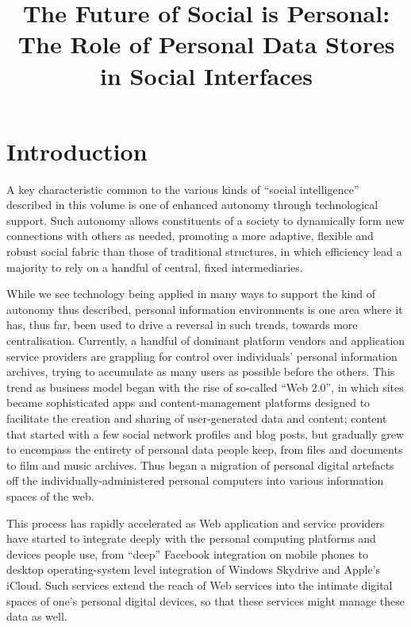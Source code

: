 \documentclass[runningheads,a4paper]{llncs}
\begin{document}
\title{The Future of Social is Personal: The Role of Personal Data Stores in Social Interfaces}


\maketitle

\section{Introduction}

A key characteristic common to the various kinds of ``social intelligence'' described in this volume is one of enhanced autonomy through technological support.  Such autonomy allows constituents of a society to dynamically form new connections with others as needed, promoting a more adaptive, flexible and robust social fabric than those of traditional structures, in which efficiency lead a majority to rely on a handful of central, fixed intermediaries.  

While we see technology being applied in many ways to support the kind of autonomy thus described, personal information environments is one area where it has, thus far, been used to drive a reversal in such trends, towards more centralisation. Currently, a handful of dominant platform vendors and application service providers are grappling for control over individuals' personal information archives, trying to accumulate as many users as possible before the others. This trend as business model began with the rise of so-called ``Web 2.0'', in which sites became sophisticated apps and content-management platforms designed to facilitate the creation and sharing of user-generated data and content; content that started with a few social network profiles and blog posts, but gradually grew to encompass the entirety of personal data people keep, from files and documents to film and music archives. Thus began a migration of personal digital artefacts off the individually-administered personal computers into various information spaces of the web.

This process has rapidly accelerated as Web application and service providers have started to integrate deeply with the personal computing platforms and devices people use, from ``deep'' Facebook integration on mobile phones to desktop operating-system level integration of Windows Skydrive and Apple's iCloud.  Such services extend the reach of Web services into the intimate digital spaces of one's personal digital devices, so that these services might manage these data as well.
\end{document}
